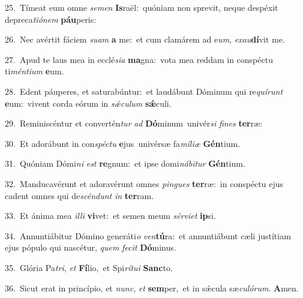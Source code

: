{\numbfont\textcolor{\numbcolor}{25.}}~Tímeat eum omne \textit{se}\-\textit{men} \textbf{Is}\-raël:~\star quóniam non sprevit, neque despéxit depreca\-\textit{ti}\-\textit{ó}\textit{nem} \textbf{páu}\-peris:\par
{\numbfont\textcolor{\numbcolor}{26.}}~Nec avértit fáciem \textit{su}\-\textit{am} \textbf{a} me:~\star et cum clamárem ad e\-\textit{um}\-, \textit{ex}\-\textit{au}\textbf{dí}vit me.\par
{\numbfont\textcolor{\numbcolor}{27.}}~Apud te laus mea in ecclé\-\textit{si}\-\textit{a} \textbf{ma}\-gna:~\star vota mea reddam in conspéctu ti\-\textit{mén}\-\textit{ti}\textit{um} \textbf{e}\-um.\par
{\numbfont\textcolor{\numbcolor}{28.}}~Edent páuperes, et saturabúntur:~\dagger et laudábunt Dóminum qui re\-\textit{quí}\-\textit{runt} \textbf{e}\-um:~\star vivent corda eórum in \textit{sǽ}\-\textit{cu}\textit{lum} \textbf{sǽ}\-culi.\par
{\numbfont\textcolor{\numbcolor}{29.}}~Reminiscéntur et convertén\textit{tur} \textit{ad} \textbf{Dó}\-minum~\star univér\textit{si} \textit{fi}\-\textit{nes} \textbf{ter}\-ræ:\par
{\numbfont\textcolor{\numbcolor}{30.}}~Et adorábunt in con\-\textit{spéc}\-\textit{tu} \textbf{e}\-jus~\star univérsæ fa\-\textit{mí}\-\textit{li}\textit{æ} \textbf{Gén}\-tium.\par
{\numbfont\textcolor{\numbcolor}{31.}}~Quóniam Dómi\textit{ni} \textit{est} \textbf{re}\-gnum:~\star et ipse domi\-\textit{ná}\-\textit{bi}\textit{tur} \textbf{Gén}\-tium.\par
{\numbfont\textcolor{\numbcolor}{32.}}~Manducavérunt et adoravérunt omnes \textit{pin}\-\textit{gues} \textbf{ter}\-ræ:~\star in conspéctu ejus cadent omnes qui de\-\textit{scén}\-\textit{dunt} \textit{in} \textbf{ter}\-ram.\par
{\numbfont\textcolor{\numbcolor}{33.}}~Et ánima mea \textit{il}\-\textit{li} \textbf{vi}\-vet:~\star et semen meum \textit{sér}\-\textit{vi}\textit{et} \textbf{ip}\-si.\par
{\numbfont\textcolor{\numbcolor}{34.}}~Annuntiábitur Dómino generáti\textit{o} \textit{ven}\-\textbf{tú}ra:~\star et annuntiábunt cæli justítiam ejus pópulo qui nascétur, \textit{quem} \textit{fe}\-\textit{cit} \textbf{Dó}\-minus.\par
{\numbfont\textcolor{\numbcolor}{35.}}~Glória Pa\-\textit{tri}\-, \textit{et} \textbf{Fí}\-lio,~\star et Spi\-\textit{rí}\-\textit{tu}\textit{i} \textbf{Sanc}\-to.\par
{\numbfont\textcolor{\numbcolor}{36.}}~Sicut erat in princípio, et \textit{nunc}\-, \textit{et} \textbf{sem}\-per,~\star et in sǽcula sæ\-\textit{cu}\-\textit{ló}\textit{rum}. \textbf{A}\-men.\par
